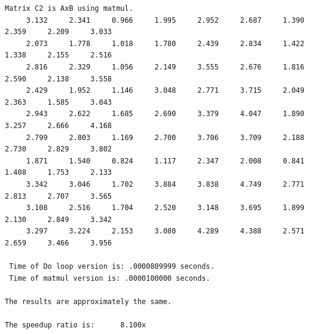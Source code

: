 \begin{verbatim}
Matrix C2 is AxB using matmul.
     3.132     2.341     0.966     1.995     2.952     2.687     1.390     2.359     2.209     3.033
     2.073     1.778     1.018     1.780     2.439     2.834     1.422     1.338     2.155     2.516
     2.816     2.329     1.056     2.149     3.555     2.676     1.816     2.590     2.138     3.558
     2.429     1.952     1.146     3.048     2.771     3.715     2.049     2.363     1.585     3.043
     2.943     2.622     1.685     2.690     3.379     4.047     1.890     3.257     2.666     4.168
     2.799     2.803     1.169     2.700     3.706     3.709     2.188     2.730     2.829     3.802
     1.871     1.540     0.824     1.117     2.347     2.008     0.841     1.408     1.753     2.133
     3.342     3.046     1.702     3.884     3.838     4.749     2.771     2.813     2.707     3.565
     3.108     2.516     1.704     2.520     3.148     3.695     1.899     2.130     2.849     3.342
     3.297     3.224     2.153     3.080     4.289     4.388     2.571     2.659     3.466     3.956

 Time of Do loop version is: .0000809999 seconds.
 Time of matmul version is: .0000100000 seconds.

The results are approximately the same.

The speedup ratio is:      8.100x
\end{verbatim}
